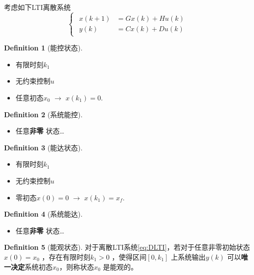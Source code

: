 \documentclass[14pt,a4paper]{article}
\theoremstyle{plain}
\theoremstyle{definition}
\newtheorem*{dfn}{Definition}
\theoremstyle{remark}
\theoremstyle{plain}
\theoremstyle{plain}
\theoremstyle{plain}
\theoremstyle{definition}
\theoremstyle{remark}
\numberwithin{equation}{section}
\begin{document}
			考虑如下LTI离散系统
			\begin{equation}
			\label{eq:DLTI} 
			\begin{cases}
				\begin{aligned}
					x(k+1) &= Gx(k) + Hu(k) \\
				y(k) &= Cx(k) + Du(k)
				\end{aligned}  
			\end{cases} 
			\end{equation}

			\begin{dfn}[能控状态]  
			\label{dfn:；离散能控状态}\ 
				\begin{itemize}
					\item 有限时刻$k_1$ 
					\item 无约束控制$u$ 
					\item 任意初态$x_0$ $\longrightarrow$ $x(k_1)=0$. 
				\end{itemize}  
			\end{dfn}

			\begin{dfn}[系统能控]  
			\label{dfn:系统能控}\ 
				\begin{itemize}
					\item 任意\textbf{非零} 状态\ldots
				\end{itemize}  
			\end{dfn} 
			
			\begin{dfn}[能达状态]  
			\label{dfn:离散能达状态} \ 
				\begin{itemize}
					\item 有限时刻$k_1$ 
					\item 无约束控制$u$ 
					\item 零初态$x(0) = 0$ $\longrightarrow$ $x(k_1)=x_f$. 
				\end{itemize}  
			\end{dfn}

			\begin{dfn}[系统能达]  
			\label{dfn:系统能达}\ 
				\begin{itemize}
					\item 任意\textbf{非零} 状态\ldots
				\end{itemize}  
			\end{dfn} 

			\begin{dfn}[能观状态]  
			\label{dfn:离散能观状态}
			对于离散LTI系统\eqref{eq:DLTI}，若对于任意非零初始状态$x(0)=x_0$ ，存在有限时刻$k_1>0$ ，使得区间$\left[ 0,k_1 \right] $ 上系统输出$y(k)$ 可以\textbf{唯一决定}系统初态$x_0$，则称状态$x_0$ 是能观的。
			\end{dfn}
\end{document}
